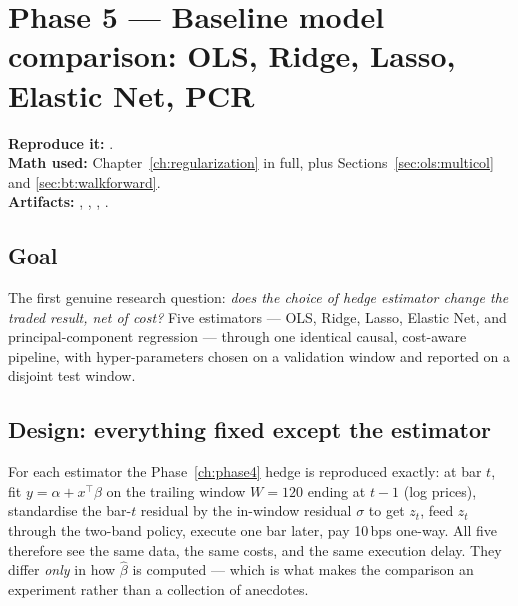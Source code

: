 \section{Phase 5 --- Baseline model comparison: OLS, Ridge, Lasso, Elastic Net, PCR}
\label{ch:phase5}

\textbf{Reproduce it:} .\\
\textbf{Math used:} Chapter~\ref{ch:regularization} in full, plus
Sections~\ref{sec:ols:multicol} and \ref{sec:bt:walkforward}.\\
\textbf{Artifacts:} ,
,
,
.

\subsection{Goal}

The first genuine research question: \emph{does the choice of hedge estimator change the
traded result, net of cost?} Five estimators --- OLS, Ridge, Lasso, Elastic Net, and
principal-component regression --- through one identical causal, cost-aware pipeline, with
hyper-parameters chosen on a validation window and reported on a disjoint test window.

\subsection{Design: everything fixed except the estimator}

For each estimator the Phase~\ref{ch:phase4} hedge is reproduced exactly: at bar $t$, fit
$y=\alpha+x^{\top}\beta$ on the trailing window $W=120$ ending at $t-1$ (log prices),
standardise the bar-$t$ residual by the in-window residual $\sigma$ to get $z_t$, feed
$z_t$ through the two-band policy, execute one bar later, pay 10\,bps one-way. All five
therefore see the same data, the same costs, and the same execution delay. They differ
\emph{only} in how $\hat\beta$ is computed --- which is what makes the comparison an
experiment rather than a collection of anecdotes.

